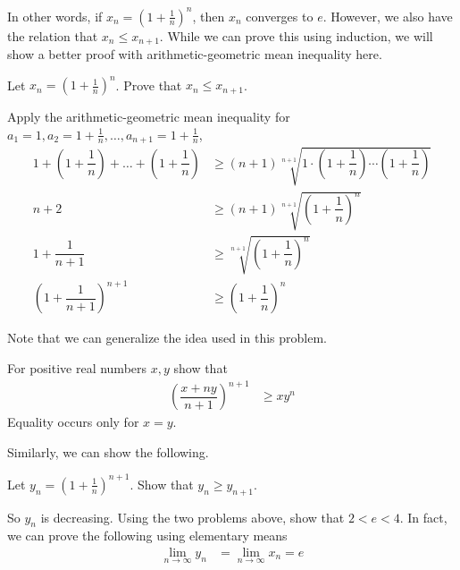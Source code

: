\documentclass{subfile}
\begin{document}
	In other words, if $x_n=\left(1+\frac{1}{n}\right)^n$, then $x_n$ converges to $e$. However, we also have the relation that $x_n\leq x_{n+1}$. While we can prove this using induction, we will show a better proof with arithmetic-geometric mean inequality here.
		\begin{problem}
			Let $x_n=\left(1+\frac{1}{n}\right)^n$. Prove that $x_n\leq x_{n+1}$.
				\begin{solution}
					Apply the arithmetic-geometric mean inequality for $a_1=1,a_2=1+\frac{1}{n},\ldots,a_{n+1}=1+\frac{1}{n}$,
						\begin{align*}
							1+\left(1+\dfrac{1}{n}\right)+\ldots+\left(1+\dfrac{1}{n}\right)
								& \geq(n+1)\sqrt[n+1]{1\cdot\left(1+\dfrac{1}{n}\right)\cdots\left(1+\dfrac{1}{n}\right)}\\
							n+2
								& \geq(n+1)\sqrt[n+1]{\left(1+\dfrac{1}{n}\right)^n}\\
							1+\dfrac{1}{n+1}
								& \geq\sqrt[n+1]{\left(1+\dfrac{1}{n}\right)^n}\\
							\left(1+\dfrac{1}{n+1}\right)^{n+1}
								& \geq\left(1+\dfrac{1}{n}\right)^n
						\end{align*}
				\end{solution}
		\end{problem}
	Note that we can generalize the idea used in this problem.
		\begin{problem}
			For positive real numbers $x,y$ show that
				\begin{align*}
					\left(\dfrac{x+ny}{n+1}\right)^{n+1}
						& \geq xy^n
				\end{align*}
			Equality occurs only for $x=y$.
		\end{problem}
	Similarly, we can show the following.
		\begin{problem}
			Let $y_n=\left(1+\frac{1}{n}\right)^{n+1}$. Show that $y_n\geq y_{n+1}$.
		\end{problem}
	So $y_n$ is decreasing. Using the two problems above, show that $2<e<4$. In fact, we can prove the following using elementary means
		\begin{align*}
			\lim\limits_{n\to\infty}y_{n}
				& = \lim\limits_{n\to\infty}x_{n}=e
		\end{align*}
	
\end{document}
